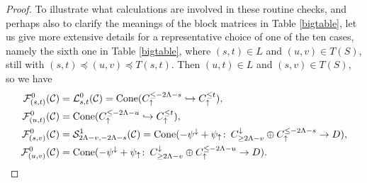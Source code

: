 \documentclass[11pt]{amsart}
\theoremstyle{definition}
\theoremstyle{remark}
\numberwithin{equation}{section}
\def\co{\colon\thinspace}
\begin{document}
\begin{proof}
To illustrate what calculations are involved in these routine checks, and perhaps also to clarify the meanings of the block matrices in Table \ref{bigtable}, let us give more extensive details for a representative choice of one of the ten cases, namely the sixth one in Table \ref{bigtable}, where $(s,t)\in L$ and $(u,v)\in T(S)$, still with $(s,t)\preceq (u,v)\preceq T(s,t)$.  Then $(u,t)\in L$ and $(s,v)\in T(S)$, 
so we have \begin{align*}
	\mathcal{F}_{(s,t)}^{0}(\mathcal{C}) &=\mathcal{L}_{s,t}^{0}(\mathcal{C})=\mathrm{Cone}(C_{\uparrow}^{\leq -2\Lambda-s}\hookrightarrow C_{\uparrow}^{\leq t}), \\ \mathcal{F}_{(u,t)}^{0}(\mathcal{C})&=\mathrm{Cone}(C_{\uparrow}^{\leq -2\Lambda-u}\hookrightarrow C_{\uparrow}^{\leq t}), \\ \mathcal{F}_{(s,v)}^{0}(\mathcal{C})&=\mathcal{S}^{1}_{2\Lambda-v,-2\Lambda-s}(\mathcal{C})=\mathrm{Cone}(-\psi^{\downarrow}+\psi_{\uparrow}\co C^{\downarrow}_{\geq 2\Lambda-v}\oplus C_{\uparrow}^{\leq -2\Lambda-s}\to D), \\ 
	\mathcal{F}_{(u,v)}^{0}(\mathcal{C})&=\mathrm{Cone}(-\psi^{\downarrow}+\psi_{\uparrow}\co C^{\downarrow}_{\geq 2\Lambda-v}\oplus C_{\uparrow}^{\leq -2\Lambda-u}\to D).	
\end{align*}


\end{proof}
\end{document}
